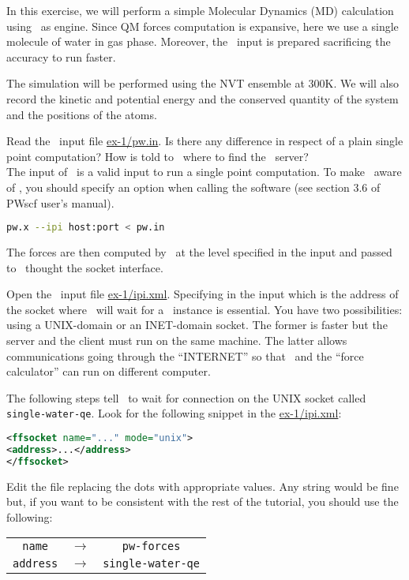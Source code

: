 \documentclass{article}
\begin{document}
\begin{Exercise}[label={i-pi},title={Molecular Dynamics: a client/server approach}]

In this exercise, we will perform a simple Molecular Dynamics (MD)
calculation using \PWscf\ as engine. Since QM forces computation is
expansive, here we use a single molecule of water in gas phase. Moreover, the
\PWscf\ input is prepared sacrificing the accuracy to run faster.

The simulation will be performed using the NVT ensemble at 300K.  We
will also record the kinetic and potential energy and the conserved
quantity of the system and the positions of the atoms.

\Question
Read the \PWscf\ input file \url{ex-1/pw.in}.
Is there any difference in respect of a plain single point computation?
How is told to \pwx\ where to find the \ipi\ server?\\

The input of \pwx\ is a valid input to run a single point
computation. To make \pwx\ aware of \ipi, you should specify an option
when calling the software (see section 3.6 of PWscf user's manual).
\begin{lstlisting}[language=bash]
pw.x --ipi host:port < pw.in
\end{lstlisting}
The forces are then computed by \pwx\ at the level specified in the
input and passed to \ipi\ thought the socket interface.

\Question
Open the \ipi\ input file \url{ex-1/ipi.xml}. Specifying in
the input which is the address of the socket where \ipi\ will wait for a \pwx\
instance is essential. You have two possibilities: using a UNIX-domain
or an INET-domain socket. The former is faster but the server and the
client must run on the same machine. The latter allows communications
going through the ``INTERNET'' so that \ipi\ and the ``force
calculator'' can run on different computer.

The following steps tell \ipi\ to wait for connection on the UNIX
socket called \texttt{single-water-qe}. Look for the following snippet
in the \url{ex-1/ipi.xml}:
\begin{lstlisting}[language=xml]
<ffsocket name="..." mode="unix">
<address>...</address>
</ffsocket>
\end{lstlisting}
Edit the file replacing the dots with appropriate values. Any string
would be fine but, if you
want to be consistent with the rest of the tutorial, you should use
the following:
\begin{table}[h!]
  \centering
  \begin{tabular}{ccc}
    \texttt{name} & $\longrightarrow$ & \texttt{pw-forces}\\
    \texttt{address} & $\longrightarrow$ & \texttt{single-water-qe}
  \end{tabular}
\end{table}



\end{Exercise}
\end{document}
